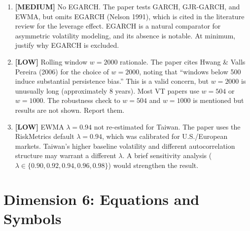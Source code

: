 \documentclass[12pt,a4paper]{article}
\newcommand{\MEDIUM}[1]{\textcolor{warncolor}{\textbf{[MEDIUM]} #1}}
\newcommand{\LOW}[1]{\textcolor{infocolor}{\textbf{[LOW]} #1}}
\begin{document}
\begin{enumerate}[leftmargin=2em]

\item \MEDIUM{No EGARCH.} The paper tests GARCH, GJR-GARCH, and EWMA, but omits EGARCH (Nelson 1991), which is cited in the literature review for the leverage effect. EGARCH is a natural comparator for asymmetric volatility modeling, and its absence is notable. At minimum, justify why EGARCH is excluded.

\item \LOW{Rolling window $w=2000$ rationale.} The paper cites Hwang \& Valls Pereira (2006) for the choice of $w=2000$, noting that ``windows below 500 induce substantial persistence bias.'' This is a valid concern, but $w=2000$ is unusually long (approximately 8 years). Most VT papers use $w=504$ or $w=1000$. The robustness check to $w=504$ and $w=1000$ is mentioned but results are not shown. Report them.

\item \LOW{EWMA $\lambda = 0.94$ not re-estimated for Taiwan.} The paper uses the RiskMetrics default $\lambda = 0.94$, which was calibrated for U.S./European markets. Taiwan's higher baseline volatility and different autocorrelation structure may warrant a different $\lambda$. A brief sensitivity analysis ($\lambda \in \{0.90, 0.92, 0.94, 0.96, 0.98\}$) would strengthen the result.

\end{enumerate}

\section{Dimension 6: Equations and Symbols}
\end{document}
